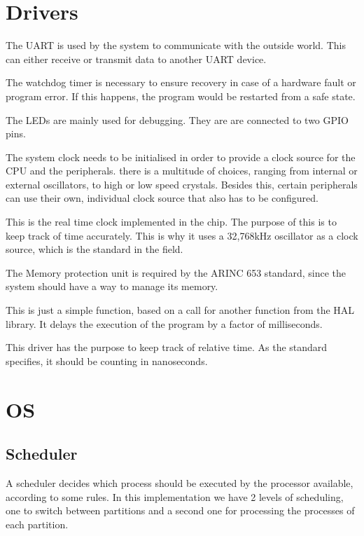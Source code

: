 \section{Drivers}
\begin{description}[align=left]
	\item [\textbf{UART driver}] The UART is used by the system to communicate with the outside
	world. This can either receive or transmit data to another UART device.
	\item [\textbf{Watchdog timer driver}] The watchdog timer is necessary to ensure recovery
	in case of a hardware fault or program error. If this happens, the program would be restarted
	from a safe state.
	\item [\textbf{LEDs}]The LEDs are mainly used for debugging. They are
	are connected to two GPIO pins.
	\item [\textbf{System Clock}]The system clock needs to be initialised 
	in order to provide a clock source for the CPU and the peripherals.
	there is a multitude of choices, ranging from internal or external
	oscillators, to high or low speed crystals. Besides this, certain
	peripherals can use their own, individual clock source that also has
	to be configured.
	\item [\textbf{RTC}]This is the real time clock implemented in the 
	chip. The purpose of this is to keep track of time accurately. This 
	is why it uses a 32,768kHz oscillator as a clock source, which is 
	the standard in the field.
	\item [\textbf{MPU}]The Memory protection unit is required by the
	ARINC 653 standard, since the system should have a way to manage its
	memory.
	\item [\textbf{Delay}]This is just a simple function, based on a call
	for another function from the HAL library. It delays the execution 
	of the program by a factor of milliseconds.
	\item [\textbf{Timing}]This driver has the purpose to keep track of 
	relative time. As the standard specifies, it should be counting in 
	nanoseconds.

\end{description}

\section{OS}
\subsection{Scheduler}
A scheduler decides which process should be executed by the processor available, according to some rules. In this implementation we have 2 levels of scheduling, one to switch between partitions and a second one for processing the processes of each partition.

